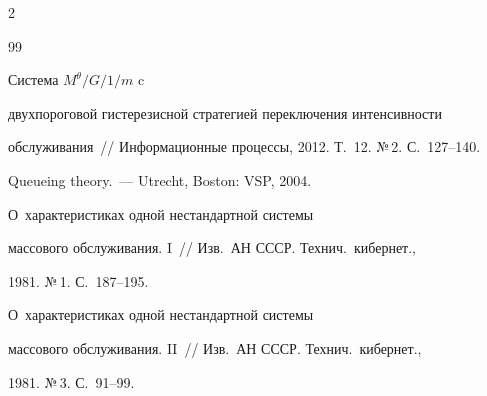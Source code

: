 \begin{multicols}{2}
{{\begin{thebibliography}{99}


 Система $M^\theta/G/1/m$ c


двухпороговой гистерезисной стратегией переключения интенсивности


обслуживания~// Информационные процессы, 2012. Т.~12. №\,2. С.~127--140.









Queueing theory.~--- Ut\-recht, Boston: VSP, 2004.







 О~характеристиках одной нестандартной сис\-те\-мы


массового обслуживания. I~// Изв.\ АН СССР. Технич.\ кибернет.,


1981. №\,1. С.~187--195.





\label{end\stat}







 О~характеристиках одной нестандартной сис\-те\-мы


массового обслуживания. II~// Изв.\ АН СССР. Технич.\ кибернет.,


1981. №\,3. С.~91--99.


\end{thebibliography}


}


}





\end{multicols}


